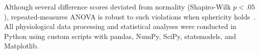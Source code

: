 Although several difference scores deviated from normality (Shapiro-Wilk $p<.05$), repeated-measures ANOVA is robust to such violations when sphericity holds~\citep{blanca2023datos}. All physiological data processing and statistical analyses were conducted in Python using custom scripts with pandas, NumPy, SciPy, statsmodels, and Matplotlib.





